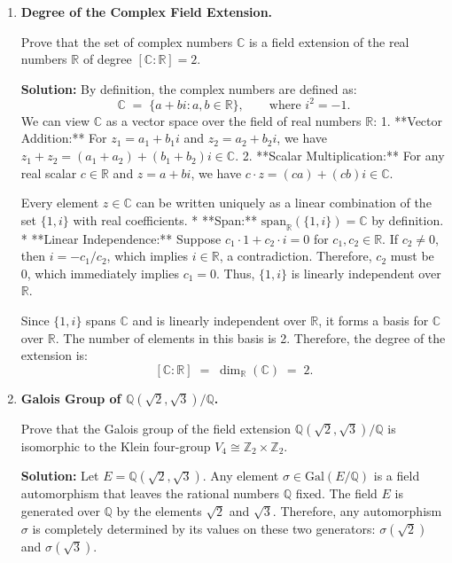 \documentclass[12pt, a4paper]{article}
\begin{document}
\begin{enumerate}[label=\textbf{E\arabic*.}]
  \item \textbf{Degree of the Complex Field Extension.}
  
        Prove that the set of complex numbers $\mathbb{C}$ is a field extension of the real numbers $\mathbb{R}$ of degree $[\mathbb{C}:\mathbb{R}] = 2$.
        
        \textbf{Solution:}
        By definition, the complex numbers are defined as:
        \[
          \mathbb{C} \;=\; \{a + b i : a, b \in \mathbb{R}\}, \qquad \text{where } i^2 = -1.
        \]
        We can view $\mathbb{C}$ as a vector space over the field of real numbers $\mathbb{R}$:
        1. **Vector Addition:** For $z_1 = a_1 + b_1 i$ and $z_2 = a_2 + b_2 i$, we have $z_1 + z_2 = (a_1+a_2) + (b_1+b_2) i \in \mathbb{C}$.
        2. **Scalar Multiplication:** For any real scalar $c \in \mathbb{R}$ and $z = a + b i$, we have $c \cdot z = (c a) + (c b) i \in \mathbb{C}$.
        
        Every element $z \in \mathbb{C}$ can be written uniquely as a linear combination of the set $\{1, i\}$ with real coefficients.
        * **Span:** $\text{span}_{\mathbb{R}}(\{1, i\}) = \mathbb{C}$ by definition.
        * **Linear Independence:** Suppose $c_1 \cdot 1 + c_2 \cdot i = 0$ for $c_1, c_2 \in \mathbb{R}$.
          If $c_2 \neq 0$, then $i = -c_1/c_2$, which implies $i \in \mathbb{R}$, a contradiction.
          Therefore, $c_2$ must be 0, which immediately implies $c_1 = 0$.
          Thus, $\{1, i\}$ is linearly independent over $\mathbb{R}$.
        
        Since $\{1, i\}$ spans $\mathbb{C}$ and is linearly independent over $\mathbb{R}$, it forms a basis for $\mathbb{C}$ over $\mathbb{R}$.
        The number of elements in this basis is 2.
        Therefore, the degree of the extension is:
        \[
          [\mathbb{C}:\mathbb{R}] \;=\; \dim_{\mathbb{R}}(\mathbb{C}) \;=\; 2.
        \]
        
  \item \textbf{Galois Group of $\mathbb{Q}(\sqrt{2}, \sqrt{3})/\mathbb{Q}$.}
  
        Prove that the Galois group of the field extension $\mathbb{Q}(\sqrt{2}, \sqrt{3})/\mathbb{Q}$ is isomorphic to the Klein four-group $V_4 \cong \mathbb{Z}_2 \times \mathbb{Z}_2$.
        
        \textbf{Solution:}
        Let $E = \mathbb{Q}(\sqrt{2}, \sqrt{3})$. Any element $\sigma \in \text{Gal}(E/\mathbb{Q})$ is a field automorphism that leaves the rational numbers $\mathbb{Q}$ fixed.
        The field $E$ is generated over $\mathbb{Q}$ by the elements $\sqrt{2}$ and $\sqrt{3}$. Therefore, any automorphism $\sigma$ is completely determined by its values on these two generators: $\sigma(\sqrt{2})$ and $\sigma(\sqrt{3})$.
        

\end{enumerate}
\end{document}

